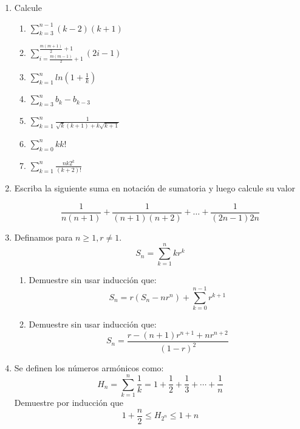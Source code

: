 \documentclass[letterpaper,11pt]{article}
\theoremstyle{plain}
\begin{document}
\begin{enumerate}[\bf P1.]
    \item Calcule
        \begin{multicols}{2}
            \begin{enumerate}
                \item $\displaystyle\sum_{k=3}^{n-1} (k-2)(k+1)$
                \item $\displaystyle \sum_{i=\frac{m(m-1)}{2}+1}^{\frac{m(m+1)}{2}+1}(2i-1) $
                \item $\displaystyle \sum_{k=1}^{n} ln(1+\frac{1}{k})$
                \item $\displaystyle\sum_{k=3}^n b_{k}-b_{k-3}$
                \item $\displaystyle\sum\limits_{k=1}^n \frac{1}{\sqrt{k}(k+1) + k\sqrt{k+1}}$
                \item $\displaystyle\sum_{k=0}^n{ kk! }$
                \item $\displaystyle \sum_{k=1}^n \frac{nk2^k}{(k+2)!}$
            \end{enumerate}
        \end{multicols}
    
    \item Escriba la siguiente suma en notación de sumatoria y luego calcule su valor
    
    $$\dfrac{1}{n(n+1)}+ \dfrac{1}{(n+1)(n+2)}+ \dots + \dfrac{1}{(2n-1)2n} $$
    
    \item Definamos para $n\geq 1, r\neq 1$.
    $$\displaystyle S_{n}=\sum_{k=1}^{n}kr^k $$
    \begin{enumerate}
        \item Demuestre sin usar inducción que:
        $$\displaystyle S_{n}= r(S_{n}-nr^n)+\sum_{k=0}^{n-1}r^{k+1} $$
        \item Demuestre sin usar inducción que:
        $$\displaystyle S_{n}= \frac{r-(n+1)r^{n+1}+nr^{n+2}}{(1-r)^2} $$
    \end{enumerate}
    
    \item Se definen los números armónicos como:
    $$\displaystyle H_n=\sum_{k=1}^{n} \frac{1}{k}=1+\frac{1}{2}+\frac{1}{3}+\cdots + \frac{1}{n}$$
    Demuestre por inducción que 
    $$\displaystyle 1+\frac{n}{2} \leq H_{2^{n}} \leq 1+n $$
    
\end{enumerate}
\end{document}
